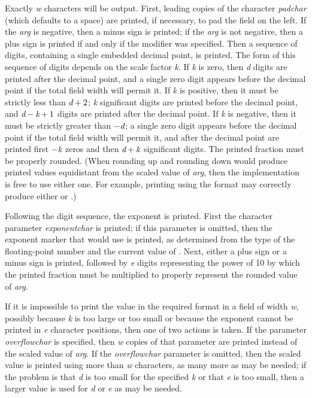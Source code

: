 \begin{flushdesc}
Exactly \emph{w} characters will
be output.  First, leading copies of the character \emph{padchar}
(which defaults to a space) are printed, if necessary, to pad the
field on the left.
If the \emph{arg} is negative, then a minus sign is printed;
if the \emph{arg} is not negative, then a plus sign is printed
if and only if the \cd{{\Xatsign}} modifier was specified.  Then a sequence
of digits, containing a single embedded decimal point, is printed.
The form of this sequence of digits depends on the scale factor \emph{k}.
If \emph{k} is zero, then \emph{d} digits are printed after the decimal
point, and a single zero digit appears before the decimal point if
the total field width will permit it.  If \emph{k} is positive,
then it must be strictly less than $\emph{d}+2$;  \emph{k} significant digits
are printed before the decimal point, and $\emph{d}-\emph{k}+1$
digits are printed after the decimal point.  If \emph{k} is negative,
then it must be strictly greater than $-\emph{d}$;
a single zero digit appears before the decimal point if
the total field width will permit it, and after the decimal point
are printed first
$-\emph{k}$ zeros and then $\emph{d}+\emph{k}$ significant digits.
The printed fraction must be properly rounded.
(When rounding up and rounding down would produce printed values
equidistant from the scaled value of \emph{arg}, then the implementation
is free to use either one.  For example, printing
 using the format  may correctly produce
either  or .)

Following the digit sequence, the exponent is printed.
First the character parameter \emph{exponentchar} is printed; if this
parameter is omitted, then the exponent marker that
 would use is printed, as determined from the
type of the floating-point number and the current value of
.
Next, either a plus sign or a minus sign
is printed, followed by \emph{e} digits representing the power of
10 by which the printed fraction must be multiplied
to properly represent the rounded value of \emph{arg}.

If it is impossible to print the value in the required format in a field
of width \emph{w}, possibly because \emph{k} is too large or too small
or because the exponent cannot be printed in \emph{e} character positions,
then one of two actions is taken.  If the
parameter \emph{overflowchar} is specified, then \emph{w} copies of that
parameter are printed instead of the scaled value of \emph{arg}.
If the \emph{overflowchar} parameter is omitted, then the scaled value
is printed using more than \emph{w} characters, as many more as may be
needed; if the problem is that \emph{d} is too small for the specified \emph{k}
or that \emph{e} is too small, then a larger value is used for \emph{d} or \emph{e}
as may be needed.


\end{flushdesc}
